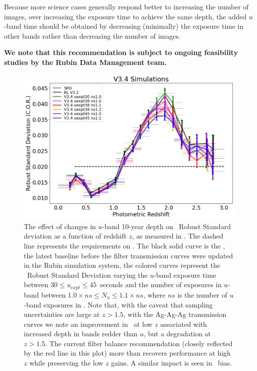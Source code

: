Because more science cases generally respond better to increasing the number of images, over increasing the exposure time to achieve the same depth, the added $u$-band time should be obtained by decreasing (minimally) the exposure time in other bands rather than decreasing the number of images.

\textbf{ We note that this recommendation is subject to ongoing feasibility studies by the Rubin Data 
Management team.}

\begin{figure}
  \centering
 \includegraphics[height=0.6\textwidth]{figures/photo-z.png}

\caption{The effect of changes in $u$-band 10-year depth on \pz\ Robust Standard deviation as a function of redshift $z$, as measured in \cite{Graham_2017}. The dashed line represents the  requirements on \pz. The black solid curve is the , the latest baseline before the filter transmission curves were updated in the Rubin simulation system, the colored curves represent the \pz\ Robust Standard Deviation varying the  $u$-band exposure time between $30\leq u_{expt} \leq45$~seconds and the number of exposures in $u$-band between $1.0\times ns \leq N_u \leq 1.1\times ns$, where $ns$ is the number of $u$-band exposures in . Note that, with the caveat that sampling uncertainties are large at $z>1.5$, with the Ag-Ag-Ag transmission curves we note an improvement in \pz\ at low $z$ associated with increased depth in bands redder than $u$, but a degradation at $z>1.5$. The current filter balance recommendation (closely reflected by the red line in this plot) more than recovers performance at high $z$ while preserving the low $z$ gains. A similar impact is seen in \pz\ bias.}
\label{fig:pz}
\end{figure}

